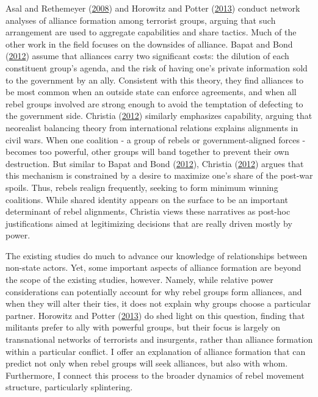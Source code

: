\documentclass[12pt,]{book}
\theoremstyle{definition}
\theoremstyle{definition}
\theoremstyle{remark}
\begin{document}
Asal and Rethemeyer (\protect\hyperlink{ref-Asal2008}{2008}) and
Horowitz and Potter (\protect\hyperlink{ref-Horowitz2013}{2013}) conduct
network analyses of alliance formation among terrorist groups, arguing
that such arrangement are used to aggregate capabilities and share
tactics. Much of the other work in the field focuses on the downsides of
alliance. Bapat and Bond (\protect\hyperlink{ref-Bapat2012}{2012})
assume that alliances carry two significant costs: the dilution of each
constituent group's agenda, and the risk of having one's private
information sold to the government by an ally. Consistent with this
theory, they find alliances to be most common when an outside state can
enforce agreements, and when all rebel groups involved are strong enough
to avoid the temptation of defecting to the government side. Christia
(\protect\hyperlink{ref-Christia2012}{2012}) similarly emphasizes
capability, arguing that neorealist balancing theory from international
relations explains alignments in civil wars. When one coalition - a
group of rebels or government-aligned forces - becomes too powerful,
other groups will band together to prevent their own destruction. But
similar to Bapat and Bond (\protect\hyperlink{ref-Bapat2012}{2012}),
Christia (\protect\hyperlink{ref-Christia2012}{2012}) argues that this
mechanism is constrained by a desire to maximize one's share of the
post-war spoils. Thus, rebels realign frequently, seeking to form
minimum winning coalitions. While shared identity appears on the surface
to be an important determinant of rebel alignments, Christia views these
narratives as post-hoc justifications aimed at legitimizing decisions
that are really driven mostly by power.

The existing studies do much to advance our knowledge of relationships
between non-state actors. Yet, some important aspects of alliance
formation are beyond the scope of the existing studies, however. Namely,
while relative power considerations can potentially account for why
rebel groups form alliances, and when they will alter their ties, it
does not explain why groups choose a particular partner. Horowitz and
Potter (\protect\hyperlink{ref-Horowitz2013}{2013}) do shed light on
this question, finding that militants prefer to ally with powerful
groups, but their focus is largely on transnational networks of
terrorists and insurgents, rather than alliance formation within a
particular conflict. I offer an explanation of alliance formation that
can predict not only when rebel groups will seek alliances, but also
with whom. Furthermore, I connect this process to the broader dynamics
of rebel movement structure, particularly splintering.
\end{document}
